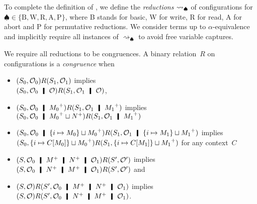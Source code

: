 To complete the definition of \lgd,
 we define the \textit{reductions} $\rightsquigarrow_\spadesuit$ of
 configurations for $\spadesuit\in\{\mathrm B, \mathrm W, \mathrm R, \mathrm A,
 \mathrm P\}$, where B stands for basic, W for write, R for read, A for
 abort and P for permutative reductions.
 We consider terms up to $\alpha$-equivalence and implicitly
 require all instances
 of $\rightsquigarrow_\spadesuit$ to avoid free variable captures.

We require all reductions to be congruences.
A binary relation~$R$ on configurations is a \textit{congruence}
when
\begin{itemize}
 \item $({S_0},{\mathcal{O}_0}) R ({S_1},{\mathcal{O}_1})$ implies\\
       $\concreteconf{S_0}{\hypert_0\hmid \hypert} R
       \concreteconf{S_1}{\hypert_1\hmid \hypert}$,
 \item $\concreteconf{S_0}{\hypert_0\hmid \m{M_0}} R
       \concreteconf{S_1}{\hypert_1 \hmid \m{M_1}}$ implies\\
       $\concreteconf{S_0}{\hypert_0\hmid \m{M_0}\sqcup \m{N}} R
       \concreteconf{S_1}{\hypert_1\hmid \m{M_1}}$
 \item $\concreteconf{S_0}{\hypert_0\hmid \{i\mapsto M_0\}\sqcup
       \m{M_0}} R \concreteconf{S_1}{\hypert_1\hmid \imapsto{M_1}\sqcup
       \m{M_1}}$ implies\\
       $({S_0},{\{i\mapsto {C[M_0]}\}\sqcup {M_0}^+}) R
       ({S_1},{\{i\mapsto {C[M_1]}\}\sqcup {M_1}^+})$ for any
       context~$C$
 \item $\concreteconf{S}{\hypert_0\hmid \m{M}\hmid \m{N} \hmid \hypert_1}
       R \concreteconf{S'}{\hypert'}$
       implies\\
       $\concreteconf{S}{\hypert_0\hmid \m{N}\hmid \m{M} \hmid \hypert_1}
       R \concreteconf{S'}{\hypert'}$ and
 \item $\concreteconf{S}{\hypert} R \concreteconf{S'}{\hypert_0\hmid
       \m{M}\hmid \m{N}\hmid \hypert_1}$
       implies\\
       $\concreteconf{S}{\hypert} R \concreteconf{S'}{\hypert_0\hmid
       \m{N}\hmid \m{M}\hmid \hypert_1}$.
\end{itemize}

